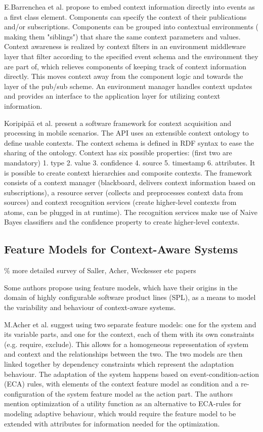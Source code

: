 E.Barrenchea et al. propose to embed context information directly into events as a first class element. Components can specify the context of their publications and/or subscriptions. Components can be grouped into contextual environments ( making them "siblings") that share the same context parameters and values. Context awareness is realized by context filters in an environment middleware layer that filter according to the specified event schema and the environment they are part of, which relieves components of keeping track of context information directly. This moves context away from the component logic and towards the layer of the pub/sub scheme.  An environment manager handles context updates and provides an interface to the application layer for utilizing  context information.

Koripip\"a\"a et al. present a software framework for context acquisition and processing in mobile scenarios. The API uses an extensible context ontology to define usable contexts. The context schema is defined in RDF syntax to ease the sharing of the ontology. Context has six possible properties: (first two are mandatory) 1. type 2. value 3. confidence 4. source 5. timestamp 6. attributes. It is possible to create context hierarchies and composite contexts.
The framework consists of a context manager (blackboard, delivers context information based on subscriptions), a resource server (collects and preprocesses context data from sources) and context recognition services (create higher-level contexts from atoms, can be plugged in at runtime). The recognition services make use of Naive Bayes classifiers and the confidence property to create higher-level contexts.

\subsection{Feature Models for Context-Aware Systems}
\% more detailed survey of Saller, Acher, Weckesser etc papers 

Some authors propose using feature models, which have their origins in the domain of highly configurable software product lines (SPL), as a means to model the variability and behaviour of context-aware systems.

M.Acher et al. \cite{Acher2009} suggest using two separate feature models: one for the system and its variable parts, and one for the context, each of them with its own constraints (e.g. require, exclude). This allows for a homogeneous representation of system and context and the relationships between the two. The two models are then linked together by dependency constraints which represent the adaptation behaviour. The adaptation of the system happens based on event-condition-action (ECA) rules, with elements of the context feature model as condition and a re-configuration of the system feature model as the action part. The authors mention optimization of a utility function as an alternative to ECA-rules for modeling adaptive behaviour, which would require the feature model to be extended with attributes for information needed for the optimization.

